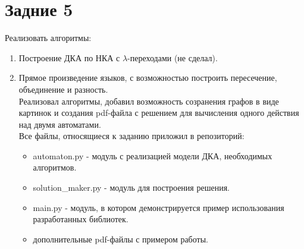 \documentclass{article}
\begin{document}
    \section*{Задние 5}
    Реализовать алгоритмы:
    \begin{enumerate}
        \item Построение ДКА по НКА с \(\lambda\)-переходами (не сделал).
        \item Прямое произведение языков, с возможностью построить пересечение, объединение и разность.\\
        Реализовал алгоритмы, добавил возможность созранения графов в виде картинок и создания pdf-файла с решением для вычисления одного действия над двумя автоматами. \\Все файлы, относящиеся к заданию приложил в репозиторий:
        \begin{itemize}
            \item automaton.py - модуль с реализацией модели ДКА, необходимых алгоритмов.
            \item solution\_maker.py - модуль для построения решения.
            \item main.py - модуль, в котором демонстрируется пример использования разработанных библиотек.
            \item дополнительные pdf-файлы с примером работы.
        \end{itemize}

    \end{enumerate}
     
\end{document}
